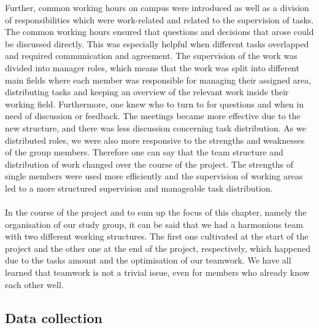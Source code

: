 Further, common working hours on campus were introduced as well as a division of responsibilities which were work-related and related to the supervision of tasks. The common working hours ensured that questions and decisions that arose could be discussed directly. This was especially helpful when different tasks overlapped and required communication and agreement.
The supervision of the work was divided into manager roles, which means that the work was split into different main fields where each member was responsible for managing their assigned area, distributing tasks and keeping an overview of the relevant work inside their working field. Furthermore, one knew who to turn to for questions and when in need of discussion or feedback. The meetings became more effective due to the new structure, and there was less discussion concerning task distribution. As we distributed roles, we were also more responsive to the strengths and weaknesses of the group members. Therefore one can say that the team structure and distribution of work changed over the course of the project. The strengths of single members were used more efficiently and the supervision of working areas led to a more structured supervision and manageable task distribution. \\
\\
In the course of the project and to sum up the focus of this chapter, namely the organisation of our study group, it can be said that we had a harmonious team with two different working structures. The first one cultivated at the start of the project and the other one at the end of the project, respectively, which happened due to the tasks amount and the optimisation of our teamwork. We have all learned that teamwork is not a trivial issue, even for members who already know each other well.


\subsection{Data collection}
\label{sec:DataCollection}

